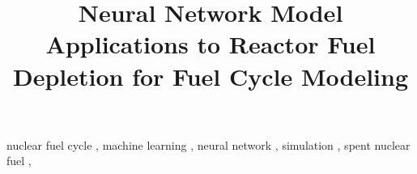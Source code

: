 \documentclass[review]{elsarticle}
\begin{document}
\begin{frontmatter}
\title{Neural Network Model Applications to Reactor Fuel Depletion for Fuel Cycle Modeling}

\date{}                     %





\begin{keyword}
nuclear fuel cycle \sep
machine learning \sep
neural network \sep
simulation \sep
spent nuclear fuel \sep
\end{keyword}


\end{frontmatter}
\glsresetall

\linenumbers






\end{document}

